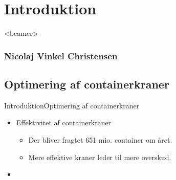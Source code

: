 \section{Introduktion}
 \begin{frame}<beamer>
 \frametitle{Nicolaj Vinkel Christensen}
 \tableofcontents[currentsection]
 \end{frame}

\subsection*{Optimering af containerkraner}
\begin{frame}{Introduktion}{Optimering af containerkraner}


 \begin{minipage}[t]{0.45\linewidth}
  \begin{itemize}
    \item<1-> Effektivitet af containerkraner 
        \begin{itemize}
          \item<1-> Der bliver fragtet 651 mio. container om året.
          \item<1-> Mere effektive kraner leder til mere overskud. 
        \end{itemize}
  \end{itemize}
  \end{minipage}
  \begin{minipage}[t]{0.42\linewidth}
    \begin{itemize}
      \item<1->[] {
}
    \end{itemize}                   
  \end{minipage}
  \end{frame}


